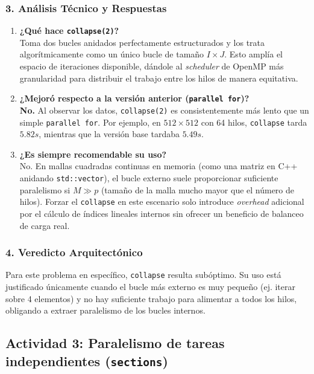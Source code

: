 \documentclass[11pt,a4paper]{article}
\begin{document}
\subsubsection*{3. Análisis Técnico y Respuestas}

\begin{enumerate}
    \item \textbf{¿Qué hace \texttt{collapse(2)}?} \\
    Toma dos bucles anidados perfectamente estructurados y los trata algorítmicamente como un único bucle de tamaño $I \times J$. Esto amplía el espacio de iteraciones disponible, dándole al \textit{scheduler} de OpenMP más granularidad para distribuir el trabajo entre los hilos de manera equitativa.

    \item \textbf{¿Mejoró respecto a la versión anterior (\texttt{parallel for})?} \\
    \textbf{No.} Al observar los datos, \texttt{collapse(2)} es consistentemente más lento que un simple \texttt{parallel for}. Por ejemplo, en $512 \times 512$ con 64 hilos, \texttt{collapse} tarda $5.82s$, mientras que la versión base tardaba $5.49s$. 

    \item \textbf{¿Es siempre recomendable su uso?} \\
    No. En mallas cuadradas continuas en memoria (como una matriz en C++ anidando \texttt{std::vector}), el bucle externo suele proporcionar suficiente paralelismo si $M \gg p$ (tamaño de la malla mucho mayor que el número de hilos). Forzar el \texttt{collapse} en este escenario solo introduce \textit{overhead} adicional por el cálculo de índices lineales internos sin ofrecer un beneficio de balanceo de carga real.
\end{enumerate}

\subsubsection*{4. Veredicto Arquitectónico}
Para este problema en específico, \texttt{collapse} resulta subóptimo. Su uso está justificado únicamente cuando el bucle más externo es muy pequeño (ej. iterar sobre 4 elementos) y no hay suficiente trabajo para alimentar a todos los hilos, obligando a extraer paralelismo de los bucles internos.


\subsection*{Actividad 3: Paralelismo de tareas independientes (\texttt{sections})}
\end{document}
